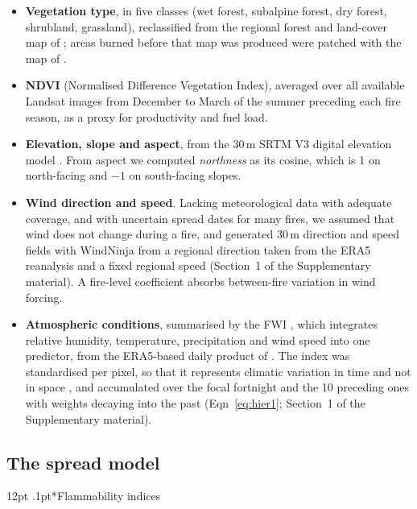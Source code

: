 \documentclass[ResearchPaper,linenum]{CSIRO_LaTeX_Template}
\makeatletter
\renewcommand\subsubsection{\@startsection{subsubsection}{3}{\z@}%
  {12pt \@plus 1pt \@minus 1pt}{.1pt}{\subsubsectionfont}}
\makeatother
\begin{document}
\begin{itemize}
\item \textbf{Vegetation type}, in five classes (wet forest, subalpine forest, dry
forest, shrubland, grassland), reclassified from the regional forest and land-cover map
of \citet{mapa_ciefap}; areas burned before that map was produced were patched with the
map of \citet{lara_vegetacion_1999}.

\item \textbf{NDVI} (Normalised Difference Vegetation Index), averaged over all
available Landsat images from December to March of the summer preceding each fire
season, as a proxy for productivity and fuel load.

\item \textbf{Elevation, slope and aspect}, from the 30\,m SRTM V3 digital elevation
model \citep{DEMfarr2007}. From aspect we computed \textit{northness} as its cosine,
which is 1 on north-facing and $-1$ on south-facing slopes.

\item \textbf{Wind direction and speed}. Lacking meteorological data with adequate
coverage, and with uncertain spread dates for many fires, we assumed that wind does not
change during a fire, and generated 30\,m direction and speed fields with WindNinja
\citep{forthofer2007windNinja} from a regional direction taken from the ERA5 reanalysis
\citep{hersbach2020era5} and a fixed regional speed (Section~1 of the Supplementary
material). A fire-level coefficient absorbs between-fire variation in wind forcing.

\item \textbf{Atmospheric conditions}, summarised by the FWI \citep{van_wagner_development_1987}, 
which integrates relative humidity, temperature,
precipitation and wind speed into one predictor, from the ERA5-based daily product of
\citet{vitolo_era5-based_2020}. The index was standardised per pixel, so that it
represents climatic variation in time and not in space \citep{barbera_patterns}, and
accumulated over the focal fortnight and the 10 preceding ones with weights decaying
into the past (Eqn~\ref{eq:hier1}; Section~1 of the Supplementary material).
\end{itemize}

\subsection{The spread model}

\subsubsection*{Flammability indices}
\end{document}
